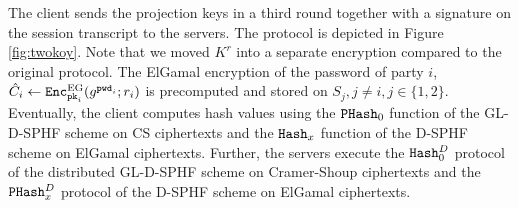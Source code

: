 The client sends the projection keys in a third round together with a signature on the session transcript to the servers.
The protocol is depicted in Figure \ref{fig:twokoy}.
Note that we moved $K^r$ into a separate encryption compared to the original protocol.
The ElGamal encryption of the password of party $i$, $\hat{C}_i\gets\mathtt{Enc}^\mathrm{EG}_{\mathtt{pk}_i}(g^{\mathtt{pwd}_i};r_i)$ is precomputed and stored on $S_{j},j\not=i,j\in\{1,2\}$.
Eventually, the client computes hash values using the $\mathtt{PHash}_0$ function of the GL-\ac{D-SPHF} scheme on CS ciphertexts and the $\mathtt{Hash}_x$ function of the \ac{D-SPHF} scheme on ElGamal ciphertexts.
Further, the servers execute the $\mathtt{Hash}_0^D$ protocol of the distributed GL-\ac{D-SPHF} scheme on Cramer-Shoup ciphertexts and the $\mathtt{PHash}_x^D$ protocol of the \ac{D-SPHF} scheme on ElGamal ciphertexts.

